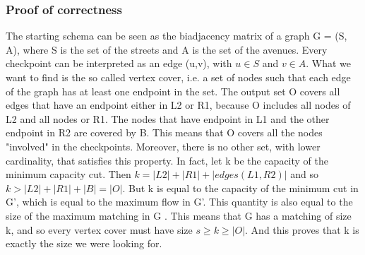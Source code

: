 \subsubsection{Proof of correctness}
The starting schema can be seen as the biadjacency matrix of a graph G = (S, A), where S is the set of the streets and A is the set of the avenues. Every checkpoint can be interpreted as an edge (u,v), with $u \in S$ and $v \in A$. What we want to find is the so called vertex cover, i.e. a set of nodes such that each edge of the graph has at least one endpoint in the set.
The output set O covers all edges that have an endpoint either in L2 or R1, because O includes all nodes of L2 and all nodes or R1. The nodes that have endpoint in L1 and the other endpoint in R2 are covered by B. This means that O covers all the nodes "involved" in the checkpoints. Moreover, there is no other set, with lower cardinality, that satisfies this property. In fact, let k be the capacity of the minimum capacity cut. Then $k = |L2| + |R1| + |edges(L1,R2)|$ and so $k > |L2| + |R1| + |B| = |O|$. But k is equal to the capacity of the minimum cut in G', which is equal to the maximum flow in G'. This quantity  is also equal to the size of the maximum matching in G \cite{Konig}. This means that G has a matching of size k, and so every vertex cover must have size $s \geq k \geq |O|$. And this proves that k is exactly the size we were looking for.